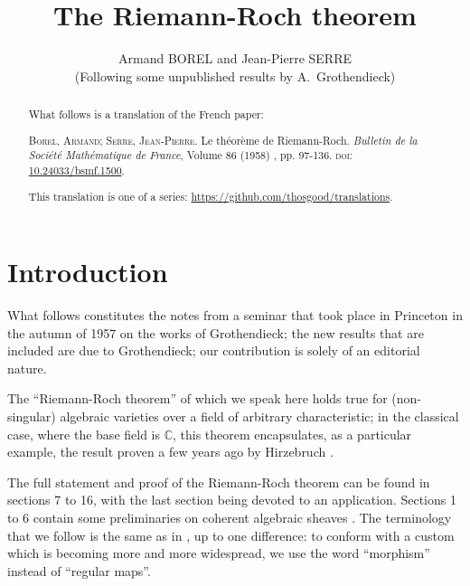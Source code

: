 \documentclass[10pt]{article}
\theoremstyle{plain}
\theoremstyle{definition}
\newcommand{\oldpage}[1]{\marginpar{\textit{p.~#1}}}
\begin{document}
\renewcommand{\abstractname}{Translator's note.}

\title{The Riemann-Roch theorem}
\author{Armand BOREL and Jean-Pierre SERRE\\(Following some unpublished results by A.~Grothendieck)}
\date{}
\maketitle

\begin{abstract}
  What follows is a translation of the French paper:

  \smallskip\noindent
  \textsc{Borel, Armand}; \textsc{Serre, Jean-Pierre}. Le théorème de Riemann-Roch. \emph{Bulletin de la Société Mathématique de France}, Volume 86 (1958) , pp. 97-136. \textsc{doi}: \href{https://www.doi.org/10.24033/bsmf.1500}{10.24033/bsmf.1500}.

  \smallskip
  This translation is one of a series: {\footnotesize\url{https://github.com/thosgood/translations}.}
\end{abstract}

\tableofcontents



\section*{Introduction}

\oldpage{97}
What follows constitutes the notes from a seminar that took place in Princeton in the autumn of 1957 on the works of Grothendieck;
the new results that are included are due to Grothendieck;
our contribution is solely of an editorial nature.

The ``Riemann-Roch theorem'' of which we speak here holds true for (non-singular) algebraic varieties over a field of arbitrary characteristic;
in the classical case, where the base field is $\mathbb{C}$, this theorem encapsulates, as a particular example, the result proven a few years ago by Hirzebruch \cite{9}.

The full statement and proof of the Riemann-Roch theorem can be found in sections 7 to 16, with the last section being devoted to an application.
Sections 1 to 6 contain some preliminaries on coherent algebraic sheaves \cite{12}.
The terminology that we follow is the same as in \cite{12}, up to one difference: to conform with a custom which is becoming more and more widespread, we use the word ``morphism'' instead of ``regular maps''.
\end{document}
